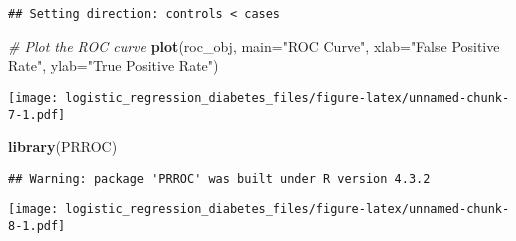 \documentclass[
]{article}
\newenvironment{Shaded}{\begin{snugshade}}{\end{snugshade}}
\newcommand{\AttributeTok}[1]{\textcolor[rgb]{0.13,0.29,0.53}{#1}}
\newcommand{\CommentTok}[1]{\textcolor[rgb]{0.56,0.35,0.01}{\textit{#1}}}
\newcommand{\ConstantTok}[1]{\textcolor[rgb]{0.56,0.35,0.01}{#1}}
\newcommand{\FunctionTok}[1]{\textcolor[rgb]{0.13,0.29,0.53}{\textbf{#1}}}
\newcommand{\NormalTok}[1]{#1}
\newcommand{\OtherTok}[1]{\textcolor[rgb]{0.56,0.35,0.01}{#1}}
\newcommand{\SpecialCharTok}[1]{\textcolor[rgb]{0.81,0.36,0.00}{\textbf{#1}}}
\newcommand{\StringTok}[1]{\textcolor[rgb]{0.31,0.60,0.02}{#1}}
\begin{document}
\begin{verbatim}
## Setting direction: controls < cases
\end{verbatim}

\begin{Shaded}
\begin{Highlighting}[]
\CommentTok{\# Plot the ROC curve}
\FunctionTok{plot}\NormalTok{(roc\_obj, }\AttributeTok{main=}\StringTok{"ROC Curve"}\NormalTok{, }\AttributeTok{xlab=}\StringTok{"False Positive Rate"}\NormalTok{, }\AttributeTok{ylab=}\StringTok{"True Positive Rate"}\NormalTok{)}
\end{Highlighting}
\end{Shaded}

\texttt{[image: logistic\_regression\_diabetes\_files/figure-latex/unnamed-chunk-7-1.pdf]}

\begin{Shaded}
\begin{Highlighting}[]
\FunctionTok{library}\NormalTok{(PRROC)}
\end{Highlighting}
\end{Shaded}

\begin{verbatim}
## Warning: package 'PRROC' was built under R version 4.3.2
\end{verbatim}

\begin{Shaded}
\end{Shaded}

\texttt{[image: logistic\_regression\_diabetes\_files/figure-latex/unnamed-chunk-8-1.pdf]}
\end{document}
